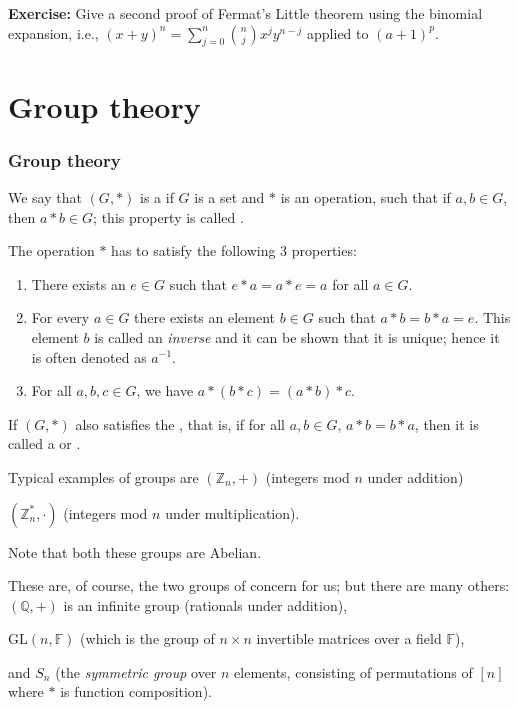 \begin{frame}

{\bf Exercise:}
Give a second proof of Fermat's Little theorem
using the binomial
expansion, i.e., $(x+y)^n=\sum_{j=0}^n{\binom{n}{j}}x^jy^{n-j}$
applied
to $(a+1)^p$.
\end{frame}

\section{Group theory}

\begin{frame}
\frametitle{Group theory}

We say that $(G,\ast)$ is a  if $G$ is
a set
and $\ast$ is an operation, such that if $a,b\in G$, then $a\ast b\in
G$; this property is called .

The operation $\ast$ has to satisfy the following 3
properties:
\begin{enumerate}
\item  {}
There exists an $e\in G$ such that $e\ast
a=a\ast e=a$ for all $a\in G$.
\item  {}
For every $a\in G$ there exists an element
$b\in G$ such that $a\ast b=b\ast a=e$.  This element $b$ is called an
{\em inverse} and it can be shown that it is unique; hence it is often
denoted as $a^{-1}$.
\item  {}
For all $a,b,c\in G$, we have
$a\ast(b\ast c)=(a\ast b)\ast c$.
\end{enumerate}
If $(G,\ast)$ also satisfies the , that is, if for
all $a,b\in G$, $a\ast b=b\ast a$, then it is called a
 or .
\end{frame}

\begin{frame}

Typical examples of groups are
$(\mathbb{Z}_n,+)$ (integers mod $n$
under addition)

$(\mathbb{Z}_n^*,\cdot)$ 
(integers mod $n$ under
multiplication).  

Note that both these groups are Abelian.  

These are,
of course, the two groups of concern for us; but there are many
others: $(\mathbb{Q},+)$
is an infinite group (rationals under
addition),

$\mathrm{GL}(n,\mathbb{F})$
(which is the group of $n\times n$
invertible matrices over a field $\mathbb{F}$), 

and $S_n$ (the
{\em symmetric group} over $n$ elements,
consisting of permutations of $[n]$ where $\ast$ is function
composition).

\end{frame}

